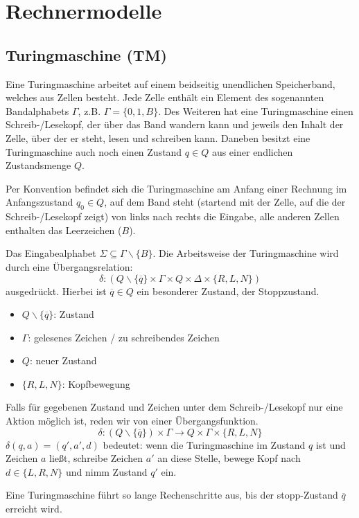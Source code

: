 \section{Rechnermodelle}

\subsection{Turingmaschine (TM)}
Eine Turingmaschine arbeitet auf einem beidseitig unendlichen Speicherband, %
welches aus Zellen besteht. Jede Zelle enthält ein Element des sogenannten Bandalphabets $\Gamma$, z.B. $\Gamma=\{ 0,1,B \}$. Des Weiteren hat eine Turingmaschine einen Schreib-/Lesekopf, der über das Band wandern kann und jeweils den Inhalt der Zelle, über der er steht, lesen und schreiben kann. Daneben besitzt eine Turingmaschine auch noch einen Zustand $q \in Q$ aus einer endlichen Zustandsmenge $Q$.

\par\medskip
Per Konvention befindet sich die Turingmaschine am Anfang einer Rechnung im Anfangszustand $q_0 \in Q$, auf dem Band steht (startend mit der Zelle, auf die der Schreib-/Lesekopf zeigt) von links nach rechts die Eingabe, alle anderen Zellen enthalten das Leerzeichen ($B$).
\par\medskip
Das Eingabealphabet $\Sigma \subseteq \Gamma \backslash \{B\}$. Die Arbeitsweise der Turingmaschine wird durch eine Übergangsrelation: $$ \delta : (Q \backslash \{ \overline{q}\} \times \Gamma \times Q \times \Delta \times \{ R,L,N \}) $$ ausgedrückt. Hierbei ist $\overline{q} \in Q$ ein besonderer Zustand, der Stoppzustand.
\par\medskip
\begin{itemize}
	\item[] $Q \backslash \{ \overline{q}\}$: Zustand
	\item[] $\Gamma$: gelesenes Zeichen / zu schreibendes Zeichen
	\item[] $Q$: neuer Zustand
	\item[] $\{ R,L,N \}$: Kopfbewegung
\end{itemize}

\par\medskip
Falls für gegebenen Zustand und Zeichen unter dem Schreib-/Lesekopf nur eine Aktion möglich ist, reden wir von einer Übergangsfunktion. $$ \delta : (Q \backslash \{ \overline{q}\}) \times \Gamma \rightarrow Q \times \Gamma \times \{R,L,N\} $$ $\delta(q,a)=(q',a',d)$ bedeutet: wenn die Turingmaschine im Zustand $q$ ist und Zeichen $a$ ließt, schreibe Zeichen $a'$ an diese Stelle, bewege Kopf nach $d \in \{L,R,N\}$ und nimm Zustand $q'$ ein.
\par\medskip
Eine Turingmaschine führt so lange Rechenschritte aus, bis der stopp-Zustand $\overline{q}$ erreicht wird.
\par\medskip

